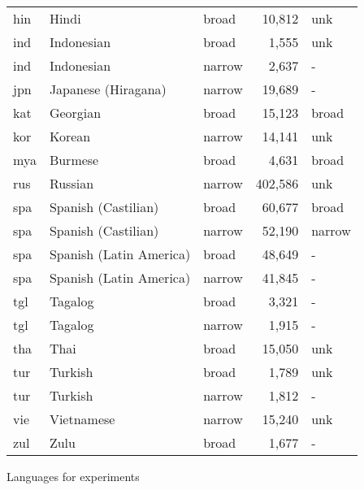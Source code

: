 {\begin{tabularx}{\textwidth}{|Xll >{\raggedright}rl|}
hin                & Hindi                   & broad                  & 10,812                     & unk               \\
ind                & Indonesian              & broad                  & 1,555                      & unk               \\
ind                & Indonesian              & narrow                 & 2,637                      & -                 \\
jpn                & Japanese (Hiragana)     & narrow                 & 19,689                     & -                 \\
kat                & Georgian                & broad                  & 15,123                     & broad             \\
kor                & Korean                  & narrow                 & 14,141                     & unk               \\
mya                & Burmese                 & broad                  & 4,631                      & broad             \\
rus                & Russian                 & narrow                 & 402,586                    & unk               \\
spa                & Spanish (Castilian)     & broad                  & 60,677                     & broad             \\
spa                & Spanish (Castilian)     & narrow                 & 52,190                     & narrow            \\
spa                & Spanish (Latin America) & broad                  & 48,649                     & -                 \\
spa                & Spanish (Latin America) & narrow                 & 41,845                     & -                 \\
tgl                & Tagalog                 & broad                  & 3,321                      & -                 \\
tgl                & Tagalog                 & narrow                 & 1,915                      & -                 \\
tha                & Thai                    & broad                  & 15,050                     & unk               \\
tur                & Turkish                 & broad                  & 1,789                      & unk               \\
tur                & Turkish                 & narrow                 & 1,812                      & -                 \\
vie                & Vietnamese              & narrow                 & 15,240                     & unk               \\
zul                & Zulu                    & broad                  & 1,677                      & -                 \\ \hline
\end{tabularx}}{Languages for experiments}

